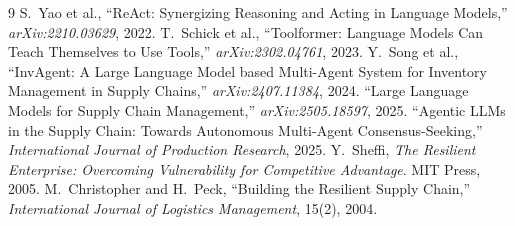 \documentclass[10pt,twocolumn]{article}
\begin{document}
\begin{thebibliography}{9}
\footnotesize
{} S.~Yao et al., ``ReAct: Synergizing Reasoning and Acting in Language Models,'' \emph{arXiv:2210.03629}, 2022.
 T.~Schick et al., ``Toolformer: Language Models Can Teach Themselves to Use Tools,'' \emph{arXiv:2302.04761}, 2023.
 Y.~Song et al., ``InvAgent: A Large Language Model based Multi-Agent System for Inventory Management in Supply Chains,'' \emph{arXiv:2407.11384}, 2024.
 ``Large Language Models for Supply Chain Management,'' \emph{arXiv:2505.18597}, 2025.
 ``Agentic LLMs in the Supply Chain: Towards Autonomous Multi-Agent Consensus-Seeking,'' \emph{International Journal of Production Research}, 2025.
 Y.~Sheffi, \emph{The Resilient Enterprise: Overcoming Vulnerability for Competitive Advantage}. MIT Press, 2005.
 M.~Christopher and H.~Peck, ``Building the Resilient Supply Chain,'' \emph{International Journal of Logistics Management}, 15(2), 2004.
\end{thebibliography}
\end{document}
